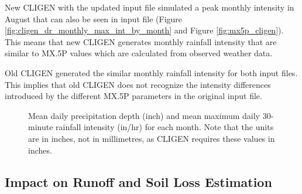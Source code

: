 New CLIGEN with the updated input file simulated a peak monthly intensity in
August that can also be seen in input file (Figure
\ref{fig:cligen_dr_monthly_max_int_by_month} and Figure \ref{fig:mx5p_cligen}).
This means that new CLIGEN generates monthly rainfall intensity that are similar
to {MX.5P} values which are calculated from observed weather data.

Old CLIGEN generated the similar monthly rainfall intensity for both input
files. This implies that old CLIGEN does not recognize the intensity differences
introduced by the different {MX.5P} parameters in the original input file.

\begin{figure}[htbp]
  \centering
  \caption[Mean daily precipitation depth and mean maximum daily 30-minute
rainfall intensity for each month]{Mean daily precipitation depth (inch) and
mean maximum daily 30-minute rainfall intensity (in/hr) for each month. Note
that the units are in inches, not in millimetres, as CLIGEN requires these
values in inches.}
  \label{fig:mean_p_mx5p_cligen}
\end{figure}

\subsection{Impact on Runoff and Soil Loss Estimation}

